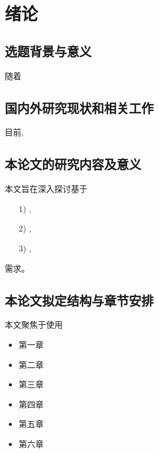 \chapter{绪论}
\label{cha:introduction}
\section{选题背景与意义}
\label{sec:background}
随着
\section{国内外研究现状和相关工作}
\label{sec:related_work}
目前, 
\section{本论文的研究内容及意义}
\label{sec:main_work}
本文旨在深入探讨基于
\begin{itemize}
    \item[1)] ,
    \item[2)] ,
    \item[3)] ,
\end{itemize}

需求。


\section{本论文拟定结构与章节安排}
\label{sec:arrangement}
本文聚焦于使用

\begin{itemize}
    \item 第一章
    \item 第二章
    \item 第三章
    \item 第四章
    \item 第五章
    \item 第六章
\end{itemize}
